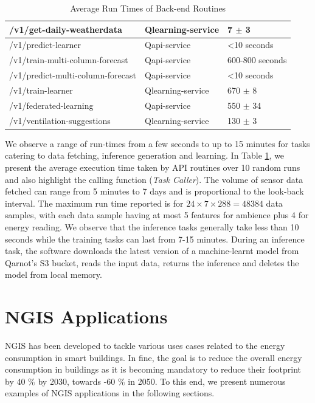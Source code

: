 \begin{table}[]
\begin{tabular}{|l|l|l|}
/v1/get-daily-weatherdata         & Qlearning-service               & 7 $\pm$ 3                  \\ \hline
/v1/predict-learner               & Qapi-service                    & \textless 10 seconds       \\ \hline
/v1/train-multi-column-forecast   & Qapi-service                    & 600-800 seconds            \\ \hline
/v1/predict-multi-column-forecast & Qapi-service                    & \textless 10 seconds       \\ \hline
/v1/train-learner                 & Qlearning-service               & 670 $\pm$ 8                \\ \hline
/v1/federated-learning            & Qapi-service                    & 550 $\pm$ 34               \\ \hline
/v1/ventilation-suggestions       & Qlearning-service               & 130 $\pm$ 3                \\ \hline
\end{tabular}
\caption{Average Run Times of Back-end Routines }
\label{table:runtimes}
\end{table}

We observe a range of run-times from a few seconds to up to 15 minutes for tasks catering to data fetching, inference generation and learning. In Table \ref{table:runtimes}, we present the average execution time taken by API routines over 10 random runs and also highlight the calling function (\textit{Task Caller}). The volume of sensor data fetched can range from 5 minutes to 7 days and is proportional to the look-back interval. The maximum run time reported is for $24 \times 7 \times 288 = 48384$ data samples, with each data sample having at most 5 features for ambience plus 4 for energy reading. We observe that the inference tasks generally take less than 10 seconds while the training tasks can last from 7-15 minutes. During an inference task, the software downloads the latest version of a machine-learnt model from Qarnot's S3 bucket, reads the input data, returns the inference and deletes the model from local memory.

\newpage
\section{NGIS Applications}
\label{applications}
NGIS has been developed to tackle various uses cases related to the energy consumption in smart buildings.
In fine, the goal is to reduce the overall energy consumption in buildings as it is becoming mandatory to reduce their footprint by 40 $\%$ by 2030, towards -60 $\%$ in 2050. To this end, we present numerous examples of NGIS applications in the following sections.


